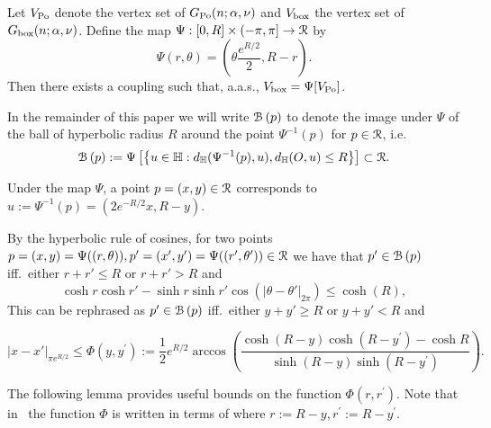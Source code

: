 \begin{lemma}\label{lem:coupling_hyperbolic_poisson}
Let $V_{{\mathrm{Po}}}$ denote the vertex set of $G_{{\mathrm{Po}}}(n;\alpha, \nu)$ and $V_{\text{box}}$ the vertex set of $G_{\mathrm{box}}(n;\alpha, \nu)$. 
Define the map $\Psi : [0,R] \times (-\pi, \pi] \to {\mathcal R}$ by
\begin{equation}\label{eq:def_Psi}
	\Psi(r,\theta) = \left(\theta \frac{e^{R/2}}{2}, R - r\right).
\end{equation}
Then there exists a coupling such that, a.a.s., $V_{\text{box}} = \Psi[V_{{\mathrm{Po}}}]$. %
\end{lemma}

In the remainder of this paper we will write ${\mathcal B}\left(p\right)$ to denote the image under $\Psi$ of the ball of hyperbolic radius $R$ around the point 
$\Psi^{-1}(p)$ for $p \in {\mathcal R}$, i.e. 
\[
	{\mathcal B}\left(p\right) := 
	\Psi\left[ \left\{ u \in {\mathbb H} : 
	d_{\mathbb{H}}(\Psi^{-1}(p),u), d_{\mathbb{H}}(O,u) \le R \right\}\right] \subset {\mathcal R}.
\]

Under the map $\Psi$, a point $p = (x,y) \in {\mathcal R}$ corresponds to $u := \Psi^{-1}(p) = (2 e^{-R/2} x, R - y)$. 

By the hyperbolic rule of cosines, for two points $p = (x,y) = \Psi( (r,\theta) ), p' = (x',y') = \Psi( (r',\theta') ) \in {\mathcal R}$ we have that $p' \in {\mathcal B}\left(p\right)$ iff.~either $r+r'\leq R$ or $r+r'>R$ and
\[
	\cosh r \cosh r' - \sinh r \sinh r'\cos\left( |\theta-\theta'|_{2\pi} \right) \le \cosh(R),
\]
This can be rephrased as $p'\in {\mathcal B}\left(p\right)$ iff.~either $y+y'\geq R$ or $y+y'<R$ and 


\begin{equation}\label{eq:def_Omega_hyperbolic}
	|x-x'|_{\pi e^{R/2}} \leq \Phi(y,y^\prime) := \frac{1}{2}e^{R/2} \arccos\left( \frac{\cosh(R-y) \cosh(R-y^\prime) - \cosh R}{\sinh(R-y) \sinh(R-y^\prime)} \right).
\end{equation}

The following lemma provides useful bounds on the function $\Phi(r,r^\prime)$. Note that in~\cite{fountoulakis2018law} the function $\Phi$ is written in terms of where $r := R - y, r^\prime := R - y^\prime$. 

